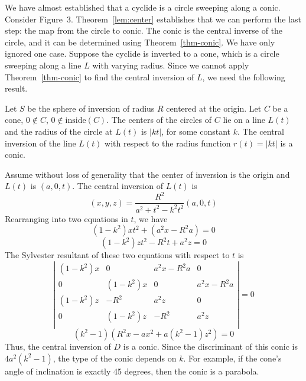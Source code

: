 We have almost established that a cyclide is a circle sweeping along a conic.
Consider Figure~3.
Theorem~\ref{lem:center} establishes that we can perform the last step: the
map from the circle to conic.
The conic is the central inverse of the circle, and it can be determined
using Theorem~\ref{thm-conic}.
We have only ignored one case.
Suppose the cyclide is inverted to a cone, which is a circle sweeping
along a line $L$ with varying radius.
Since we cannot apply Theorem~\ref{thm-conic} to find the central inversion
of $L$, we need the following result.

\begin{lemma}
Let $S$ be the sphere of inversion of radius $R$ centered at the origin.
Let $C$ be a cone, $0 \not \in C$, $0 \not \in \mbox{inside}(C)$.
The centers of the circles of $C$ lie on a line $L(t)$
and the radius of the circle at $L(t)$ is $|kt|$, for some constant $k$.
The central inversion of the line $L(t)$
with respect to the radius function $r(t) = |kt|$ is a conic.
\end{lemma}
Assume without loss of generality that the center of inversion is the origin
and $L(t)$ is $(a,0,t)$.
The central inversion of $L(t)$ is
\[
	(x,y,z) = \frac{R^{2}}{a^{2} + t^{2} - k^{2}t^{2}} (a,0,t) 
\]
Rearranging into two equations in $t$, we have
\[ (1-k^{2})xt^{2} + (a^{2}x - R^{2}a) = 0 \]
\[ (1-k^{2})zt^{2} - R^{2}t  + a^{2}z  = 0  \]
The Sylvester resultant of these two equations with respect to $t$ is
\[ \left| \begin{array}{cccc}
	(1-k^{2})x & 0 & a^{2}x - R^{2}a & 0 \\
	0 & (1-k^{2})x & 0 & a^{2}x - R^{2}a \\
	(1-k^{2})z & -R^{2} & a^{2}z & 0 \\
	0 & (1-k^{2})z & -R^{2} & a^{2}z \\
	\end{array} \right| = 0 \]
\[ (k^{2} - 1)(R^{2}x - ax^{2} + a(k^{2} - 1)z^{2})  = 0 \]
Thus, the central inversion of $D$ is a conic.
Since the discriminant of this conic is $4a^{2}(k^{2} - 1)$,
the type of the conic depends on $k$. %
For example, if the cone's angle of inclination is exactly 45 degrees,
then the conic is a parabola.
\QED


